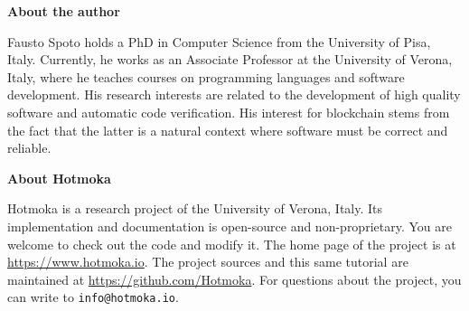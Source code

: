 \newpage

\pagestyle{empty}

\nbvspace[1]
\normalsize

\textbf{About the author}

Fausto Spoto holds a PhD in Computer Science from the University of Pisa, Italy.
Currently, he works as an Associate Professor at the University of Verona, Italy, where
he teaches courses on programming languages and software development.
His research interests are related to the development of high quality software
and automatic code verification. His interest for blockchain stems
from the fact that the latter is a natural context where
software must be correct and reliable.


\textbf{About Hotmoka}

Hotmoka is a research project of the University of Verona, Italy.
Its implementation and documentation is open-source and
non-proprietary. You are welcome to check out the code and modify it.
The home page of the project is at \url{https://www.hotmoka.io}.
The project sources and this same tutorial
are maintained at \url{https://github.com/Hotmoka}.
For questions about the project, you can write to \texttt{info@hotmoka.io}.
